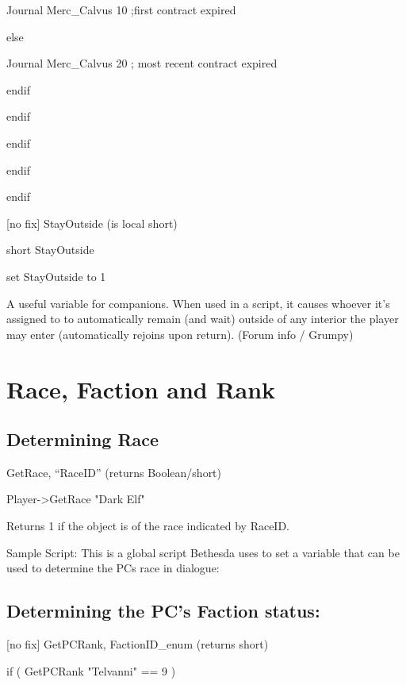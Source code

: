 \documentclass[
]{article}
\begin{document}
Journal Merc\_Calvus 10 ;first contract expired

else

Journal Merc\_Calvus 20 ; most recent contract expired

endif

endif

endif

endif

endif

{[}no fix{]} StayOutside (is local short)

short StayOutside

set StayOutside to 1

A useful variable for companions. When used in a script, it causes
whoever it's assigned to to automatically remain (and wait) outside of
any interior the player may enter (automatically rejoins upon return).
(Forum info / Grumpy)

\hypertarget{race-faction-and-rank}{%
\section{\texorpdfstring{\hfill\break
Race, Faction and
Rank}{ Race, Faction and Rank}}\label{race-faction-and-rank}}

\hypertarget{determining-race}{%
\subsection{Determining Race}\label{determining-race}}

GetRace, ``RaceID'' (returns Boolean/short)

Player-\textgreater GetRace "Dark Elf"

Returns 1 if the object is of the race indicated by RaceID.

Sample Script: This is a global script Bethesda uses to set a variable
that can be used to determine the PCs race in dialogue:



\hypertarget{determining-the-pcs-faction-status}{%
\subsection{Determining the PC's Faction
status:}\label{determining-the-pcs-faction-status}}

{[}no fix{]} GetPCRank, FactionID\_enum (returns short)

if ( GetPCRank "Telvanni" == 9 )
\end{document}
